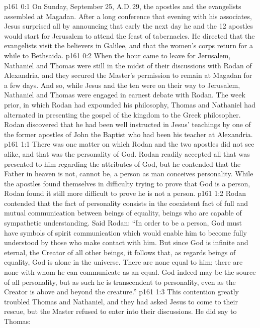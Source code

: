 \author{Midwayer Commission}
\vs p161 0:1 On Sunday, September 25, A.D.\,29, the apostles and the evangelists assembled at Magadan. After a long conference that evening with his associates, Jesus surprised all by announcing that early the next day he and the 12 apostles would start for Jerusalem to attend the feast of tabernacles. He directed that the evangelists visit the believers in Galilee, and that the women’s corps return for a while to Bethsaida.
\vs p161 0:2 When the hour came to leave for Jerusalem, Nathaniel and Thomas were still in the midst of their discussions with Rodan of Alexandria, and they secured the Master’s permission to remain at Magadan for a few days. And so, while Jesus and the ten were on their way to Jerusalem, Nathaniel and Thomas were engaged in earnest debate with Rodan. The week prior, in which Rodan had expounded his philosophy, Thomas and Nathaniel had alternated in presenting the gospel of the kingdom to the Greek philosopher. Rodan discovered that he had been well instructed in Jesus’ teachings by one of the former apostles of John the Baptist who had been his teacher at Alexandria.
\vs p161 1:1 There was one matter on which Rodan and the two apostles did not see alike, and that was the personality of God. Rodan readily accepted all that was presented to him regarding the attributes of God, but he contended that the Father in heaven is not, cannot be, a person as man conceives personality. While the apostles found themselves in difficulty trying to prove that God is a person, Rodan found it still more difficult to prove he is not a person.
\vs p161 1:2 Rodan contended that the fact of personality consists in the coexistent fact of full and mutual communication between beings of equality, beings who are capable of sympathetic understanding. Said Rodan: “In order to be a person, God must have symbols of spirit communication which would enable him to become fully understood by those who make contact with him. But since God is infinite and eternal, the Creator of all other beings, it follows that, as regards beings of equality, God is alone in the universe. There are none equal to him; there are none with whom he can communicate as an equal. God indeed may be the source of all personality, but as such he is transcendent to personality, even as the Creator is above and beyond the creature.”
\vs p161 1:3 This contention greatly troubled Thomas and Nathaniel, and they had asked Jesus to come to their rescue, but the Master refused to enter into their discussions. He did say to Thomas: 
